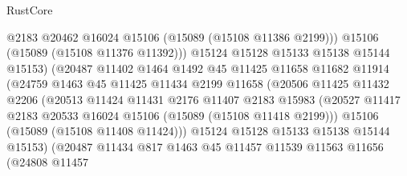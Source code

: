 \begin{lexlean}{RustCore}
\begin{coremodule}
                                @2183
                                @20462
                                @16024
                                @15106
                                (@15089 (@15108 @11386 @2199)))
                              @15106
                              (@15089 (@15108 @11376 @11392)))
                            @15124
                            @15128
                            @15133
                            @15138
                            @15144
                            @15153)
                          (@20487
                            @11402
                            @1464
                            @1492
                            @45
                            @11425
                            @11658
                            @11682
                            @11914
                            (@24759
                              @1463
                              @45
                              @11425
                              @11434
                              @2199
                              @11658
                              (@20506
                                @11425
                                @11432
                                @2206
                                (@20513
                                  @11424
                                  @11431
                                  @2176
                                  @11407
                                  @2183
                                  @15983
                                  (@20527
                                    @11417
                                    @2183
                                    @20533
                                    @16024
                                    @15106
                                    (@15089 (@15108 @11418 @2199)))
                                  @15106
                                  (@15089 (@15108 @11408 @11424)))
                                @15124
                                @15128
                                @15133
                                @15138
                                @15144
                                @15153)
                              (@20487
                                @11434
                                @817
                                @1463
                                @45
                                @11457
                                @11539
                                @11563
                                @11656
                                (@24808
                                  @11457

\end{coremodule}
\end{lexlean}
